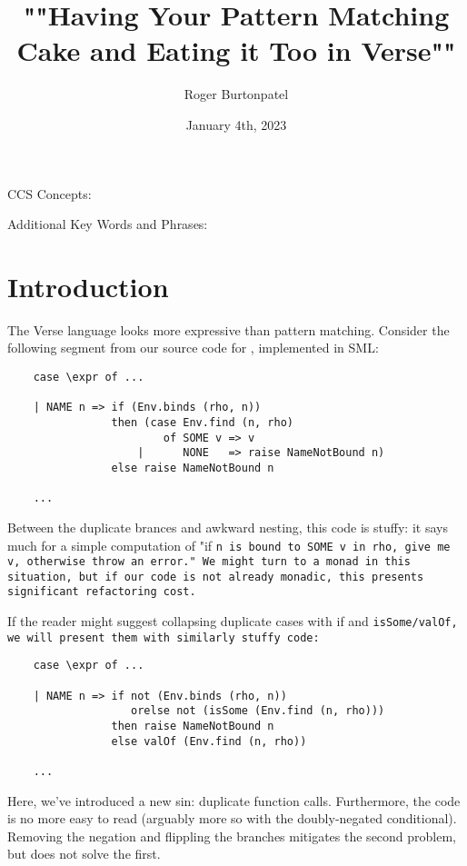 \documentclass[]{article}
\title{""Having Your Pattern Matching Cake and Eating it Too in Verse""}
\author{Roger Burtonpatel}
\date{January 4th, 2023}
\begin{document}
\maketitle

CCS Concepts: 

\bigskip

Additional Key Words and Phrases: 

\bigskip

\section{Introduction}

The Verse language looks more expressive than pattern matching. 
Consider the following segment from our source code for \Vminus, implemented
in SML:

\smllst 

\begin{lstlisting}
    case \expr of ...

    | NAME n => if (Env.binds (rho, n))
                then (case Env.find (n, rho) 
                        of SOME v => v 
                    |      NONE   => raise NameNotBound n)
                else raise NameNotBound n 

    ...
\end{lstlisting}

Between the duplicate brances and awkward nesting, this code is stuffy: it says
much for a simple computation of "if \tt{n} is bound to \tt{SOME v} in \tt{rho},
give me \tt{v}, otherwise throw an error." We might turn to a monad in this
situation, but if our code is not already monadic, this presents significant
refactoring cost. 

\bigskip
If the reader might suggest collapsing duplicate cases with if and
\tt{isSome}/\tt{valOf}, we will present them with similarly stuffy code: 
\begin{lstlisting}
    case \expr of ...

    | NAME n => if not (Env.binds (rho, n))
                   orelse not (isSome (Env.find (n, rho)))
                then raise NameNotBound n 
                else valOf (Env.find (n, rho))

    ...
\end{lstlisting}

Here, we've introduced a new sin: duplicate function calls. Furthermore, the
code is no more easy to read (arguably more so with the doubly-negated
conditional). Removing the negation and flippling the branches mitigates the 
second problem, but does not solve the first. 
\end{document}
